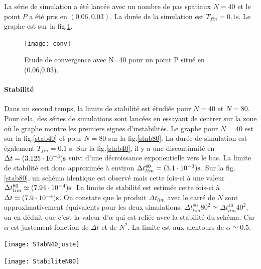\documentclass[a4paper,12pt,oneside]{article}
\begin{document}
La série de simulation a été lancée avec un nombre de pas spatiaux $N=40$ et le point $P$ a été pris en $(0.06,0.03)$. La durée de la simulation est $T_{fin}=0.1$s. Le graphe est sur la fig.\ref{etudeConv}.
 
\begin{figure}
    \centering
    \texttt{[image: conv]}
    \caption{Etude de convergence avec N=40 pour un point P situé en (0.06,0.03).}
    \label{etudeConv}
\end{figure}

\paragraph{Stabilité}

Dans un second temps, la limite de stabilité est étudiée pour $N=40$ et $N=80$. Pour cela, des séries de simulations sont lancées en essayant de centrer sur la zone où le graphe montre les premiers signes d'instabilités.  Le graphe pour $N=40$ est sur la fig.\ref{stab40} et pour $N=80$ sur la fig.\ref{stab80}. La durée de simulation est également $T_{fin}=0.1$ s. Sur la fig.\ref{stab40}, il y a une discontinuité en $\Delta t= (3.125\cdot 10^{-3}) \rm s$ suivi d'une décroissance exponentielle vers le bas. La limite de stabilité est donc approximée à environ $\Delta t_{lim}^{40} = (3.1\cdot 10^{-3}) \rm s$. Sur la fig.\ref{stab80}, un schéma identique est observé mais cette fois-ci à une valeur $\Delta t_{lim}^{80} \simeq (7.94\cdot 10^{-4}) \rm s$. La limite de stabilité est estimée cette fois-ci à $\Delta t \simeq (7.9\cdot 10^{-4}) \rm s$.
\newline On constate que le produit $\Delta t_{lim}$ avec le carré de $N$ sont approximativement équivalents pour les deux simulations. $\Delta t_{lim}^{80} 80^{2}\simeq \Delta t_{lim}^{40} 40^{2}$, on en déduit que c'est la valeur d'$\alpha$ qui est reliée avec la stabilité du schéma. Car $\alpha$ est justement fonction de $\Delta t$ et de $N^{2}$. La limite est aux alentours de $\alpha\simeq 0.5$.
 

\begin{minipage}[t]{0.5\textwidth}
\hspace{-2cm}
\texttt{[image: STabN40juste]}
\end{minipage}
\begin{minipage}[t]{0.5\textwidth}
\texttt{[image: StabiliteN80]}
\end{minipage}
\end{document}
